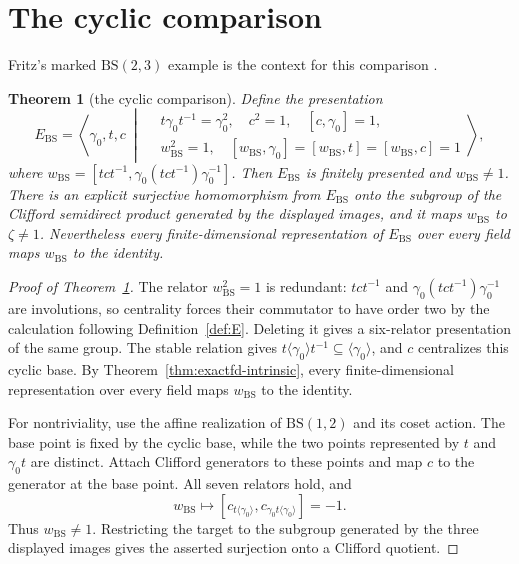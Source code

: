 \documentclass[11pt]{amsart}
\newcommand{\leanverified}[2]{\ignorespaces}
\newtheorem{theorem}{Theorem}[section]
\theoremstyle{definition}
\theoremstyle{remark}
\theoremstyle{plain}
\begin{document}
\section{The cyclic comparison}\label{sec:necessity}

Fritz's marked $\mathrm{BS}(2,3)$ example is the context for this
comparison \cite{Fritz,SlofstraVidick}.

\begin{theorem}[the cyclic comparison]\label{thm:cyclic}
Define the presentation
\[
 E_{\mathrm{BS}}=\left\langle\gamma_0,t,c\ \middle|\
 \begin{aligned}
  &t\gamma_0t^{-1}=\gamma_0^2,\quad c^2=1,\quad[c,\gamma_0]=1,\\
  &w_{\mathrm{BS}}^2=1,\quad
    [w_{\mathrm{BS}},\gamma_0]=[w_{\mathrm{BS}},t]
      =[w_{\mathrm{BS}},c]=1
 \end{aligned}\right\rangle,
\]
where
$w_{\mathrm{BS}}=[tct^{-1},\gamma_0(tct^{-1})\gamma_0^{-1}]$.
Then $E_{\mathrm{BS}}$ is finitely presented and $w_{\mathrm{BS}}\ne1$.
There is an explicit surjective homomorphism from $E_{\mathrm{BS}}$ onto
the subgroup of the Clifford semidirect product generated by the
displayed images, and it maps $w_{\mathrm{BS}}$ to $\zeta\ne1$.
Nevertheless every finite-dimensional representation of
$E_{\mathrm{BS}}$ over every field maps $w_{\mathrm{BS}}$ to the identity.
\leanverified{Monsters/LiteralCyclicCalibration}{GroupApproximation.LiteralCyclicCalibration.manuscriptCyclicCalibration}
\end{theorem}

\begin{proof}[Proof of Theorem~\ref{thm:cyclic}]
The relator $w_{\mathrm{BS}}^2=1$ is redundant: $tct^{-1}$
and $\gamma_0(tct^{-1})\gamma_0^{-1}$ are involutions, so centrality
forces their commutator to have order two by the calculation following
Definition~\ref{def:E}.  Deleting it gives a
six-relator presentation of the same group.
The stable relation gives
\(t\langle\gamma_0\rangle t^{-1}\subseteq
\langle\gamma_0\rangle\), and \(c\) centralizes this cyclic base.
By Theorem~\ref{thm:exactfd-intrinsic}, every
finite-dimensional representation over every field maps
\(w_{\mathrm{BS}}\) to the identity.

For nontriviality, use the affine realization of
\(\mathrm{BS}(1,2)\) and its coset action.  The base point is fixed by the
cyclic base, while the two points represented by \(t\) and \(\gamma_0t\)
are distinct.  Attach Clifford generators to these points and map \(c\) to
the generator at the base point.  All seven relators hold, and
\[
 w_{\mathrm{BS}}\longmapsto
 [c_{t\langle\gamma_0\rangle},
  c_{\gamma_0t\langle\gamma_0\rangle}]
 =-1.
\]
Thus \(w_{\mathrm{BS}}\ne1\).  Restricting the target to the subgroup
generated by the three displayed images gives the asserted surjection
onto a Clifford quotient.
\end{proof}
\end{document}
